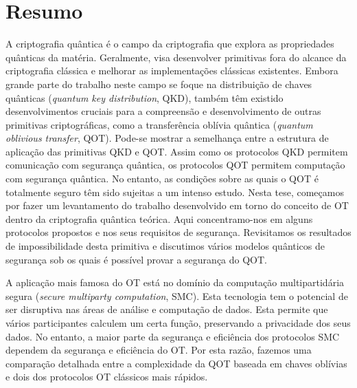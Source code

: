

\chapter*{Resumo}



A criptografia quântica é o campo da criptografia que explora as propriedades quânticas da matéria. Geralmente, visa desenvolver primitivas fora do alcance da criptografia clássica e melhorar as implementações clássicas existentes. Embora grande parte do trabalho neste campo se foque na distribuição de chaves quânticas (\textit{quantum key distribution}, QKD), também têm existido desenvolvimentos cruciais para a compreensão e desenvolvimento de outras primitivas criptográficas, como a transferência oblívia quântica (\textit{quantum oblivious transfer}, QOT). Pode-se mostrar a semelhança entre a estrutura de aplicação das primitivas QKD e QOT. Assim como os protocolos QKD permitem comunicação com segurança quântica, os protocolos QOT permitem computação com segurança quântica. No entanto, as condições sobre as quais o QOT é totalmente seguro têm sido sujeitas a um intenso estudo. Nesta tese, começamos por fazer um levantamento do trabalho desenvolvido em torno do conceito de OT dentro da criptografia quântica teórica. Aqui concentramo-nos em alguns protocolos propostos e nos seus requisitos de segurança. Revisitamos os resultados de impossibilidade desta primitiva e discutimos vários modelos quânticos de segurança sob os quais é possível provar a segurança do QOT.

A aplicação mais famosa do OT está no domínio da computação multipartidária segura (\textit{secure multiparty computation}, SMC). Esta tecnologia tem o potencial de ser disruptiva nas áreas de análise e computação de dados. Esta permite que vários participantes calculem um certa função, preservando a privacidade dos seus dados. No entanto, a maior parte da segurança e eficiência dos protocolos SMC dependem da segurança e eficiência do OT. Por esta razão, fazemos uma comparação detalhada entre a complexidade da QOT baseada em chaves oblívias e dois dos protocolos OT clássicos mais rápidos.

